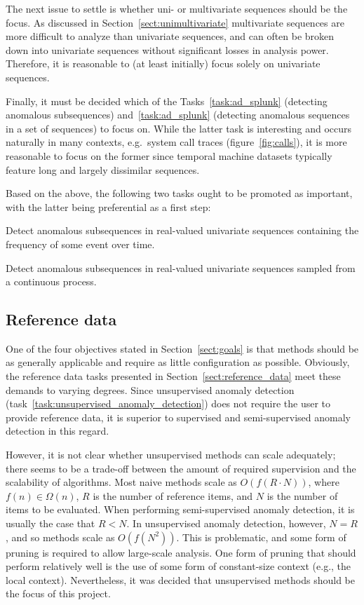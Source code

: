 The next issue to settle is whether uni- or multivariate sequences should be the focus. As discussed in Section~\ref{sect:unimultivariate} multivariate sequences are more difficult to analyze than univariate sequences, and can often be broken down into univariate sequences without significant losses in analysis power. Therefore, it is reasonable to (at least initially) focus solely on univariate sequences.

Finally, it must be decided which of the Tasks~\ref{task:ad_splunk} (detecting anomalous subsequences) and~\ref{task:ad_splunk} (detecting anomalous sequences in a set of sequences) to focus on. While the latter task is interesting and occurs naturally in many contexts, e.g.\ system call traces (figure~\ref{fig:calls}), it is more reasonable to focus on the former since temporal machine datasets typically feature long and largely dissimilar sequences.

Based on the above, the following two tasks ought to be promoted as important, with the latter being preferential as a first step:
\begin{task}
\label{task:frequency}
  Detect anomalous subsequences in real-valued univariate sequences containing the frequency of some event over time.
\end{task}
\begin{task}
\label{task:continuous}
  Detect anomalous subsequences in real-valued univariate sequences sampled from a continuous process.
\end{task}

\subsection{Reference data}

One of the four objectives stated in Section~\ref{sect:goals} is that methods should be as generally applicable and require as little configuration as possible. Obviously, the reference data tasks presented in Section~\ref{sect:reference_data} meet these demands to varying degrees. Since unsupervised anomaly detection (task~\ref{task:unsupervised_anomaly_detection}) does not require the user to provide reference data, it is superior to supervised and semi-supervised anomaly detection in this regard.

However, it is not clear whether unsupervised methods can scale adequately; there seems to be a trade-off between the amount of required supervision and the scalability of algorithms. Most naive methods scale as $O(f(R \cdot N))$, where $f(n) \in \Omega(n)$, $R$ is the number of reference items, and $N$ is the number of items to be evaluated. When performing semi-supervised anomaly detection, it is usually the case that $R < N$. In unsupervised anomaly detection, however, $N = R$, and so methods scale as $O(f(N^2))$. This is problematic, and some form of pruning is required to allow large-scale analysis. One form of pruning that should perform relatively well is the use of some form of constant-size context (e.g.\@, the local context). Nevertheless, it was decided that unsupervised methods should be the focus of this project.


